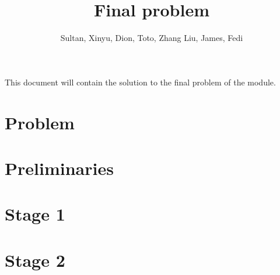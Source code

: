\documentclass[11pt,reqno,oneside,a4paper]{article}
\title{Final problem}
\author{Sultan, Xinyu, Dion, Toto, Zhang Liu, James, Fedi}
\begin{document}

\maketitle
\thispagestyle{fancy}

This document will contain the solution to the final problem of the module.

\tableofcontents

\clearpage
\section{Problem} \label{sec:Problem}


\clearpage
\section{Preliminaries} \label{sec:Preliminaries}


\clearpage
\section{Stage 1} \label{sec:Stage1}


\clearpage
\section{Stage 2} \label{sec:Stage2}


% 
\end{document}

